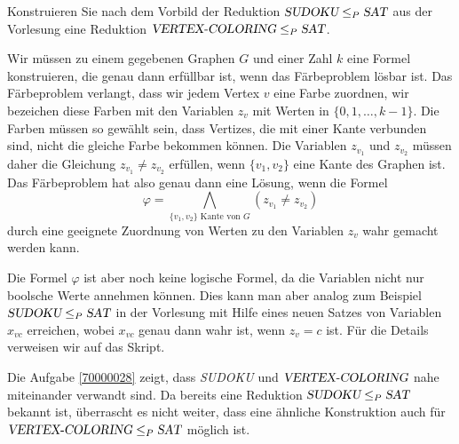 Konstruieren Sie nach dem Vorbild der Reduktion
$\textsl{SUDOKU}\le_P\textsl{SAT}$ aus der Vorlesung eine
Reduktion
$\textsl{VERTEX-COLORING}\le_P\textsl{SAT}$.

\begin{loesung}
Wir müssen zu einem gegebenen Graphen $G$ und einer Zahl $k$ eine
Formel konstruieren, die genau dann erfüllbar ist, wenn das Färbeproblem
lösbar ist. Das Färbeproblem verlangt, dass wir jedem Vertex $v$ eine
Farbe zuordnen, wir bezeichen diese Farben mit den Variablen $z_v$
mit Werten in $\{0,1,\dots,k-1\}$.
Die Farben müssen so gewählt sein, dass Vertizes, die mit einer Kante
verbunden sind, nicht die gleiche Farbe bekommen können. Die Variablen
$z_{v_1}$ und $z_{v_2}$ müssen daher die Gleichung $z_{v_1}\ne z_{v_2}$
erfüllen, wenn $\{v_1,v_2\}$ eine Kante des Graphen ist. Das Färbeproblem
hat also genau dann eine Lösung, wenn die Formel
\[
\varphi =\bigwedge_{\text{$\{v_1,v_2\}$ Kante von $G$}} (z_{v_1}\ne z_{v_2})
\]
durch eine geeignete Zuordnung von Werten zu den Variablen $z_v$ wahr gemacht
werden kann.

Die Formel $\varphi$ ist aber noch keine logische Formel, da die Variablen
nicht nur boolsche Werte annehmen können.
Dies kann man aber analog zum Beispiel $\textsl{SUDOKU}\le_P\textsl{SAT}$
in der Vorlesung mit Hilfe eines neuen Satzes von Variablen $x_{vc}$
erreichen, wobei $x_{vc}$ genau dann wahr ist, wenn $z_v=c$ ist.
Für die Details verweisen wir auf das Skript.
\end{loesung}

\begin{diskussion}
Die Aufgabe \ref{70000028} zeigt, dass \textsl{SUDOKU} und 
$\textsl{VERTEX-COLORING}$ nahe miteinander verwandt sind.
Da bereits eine Reduktion $\textsl{SUDOKU}\le_P\textsl{SAT}$
bekannt ist, überrascht es nicht weiter, dass eine ähnliche
Konstruktion auch für
$\textsl{VERTEX-COLORING}\le_P\textsl{SAT}$
möglich ist.
\end{diskussion}


